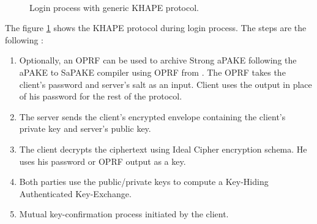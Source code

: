 ﻿\documentclass[../report.tex]{subfiles}
\begin{document}
\paragraph{}
\begin{figure}[h]
 \centering
 
 \setlength{\fboxsep}{10pt}
 \setlength{\fboxrule}{1pt}
 
 \caption{Login process with generic KHAPE protocol.}
 \label{fig:Generic_KHAPE}
\end{figure}
The figure \ref{fig:Generic_KHAPE} shows the KHAPE protocol during login process.
The steps are the following :
\begin{enumerate}
 \item Optionally, an OPRF can be used to archive Strong aPAKE following the aPAKE to SaPAKE compiler using OPRF from \cite{OPAQUE_Paper}. The OPRF takes the client's password and server's salt as an input. Client uses the output in place of his password for the rest of the protocol.
 \item The server sends the client's encrypted envelope containing the client's private key and server's public key.
 \item The client decrypts the ciphertext using Ideal Cipher encryption schema. He uses his password or OPRF output as a key.
 \item Both parties use the public/private keys to compute a Key-Hiding Authenticated Key-Exchange.
 \item Mutual key-confirmation process initiated by the client.
\end{enumerate}
\end{document}
